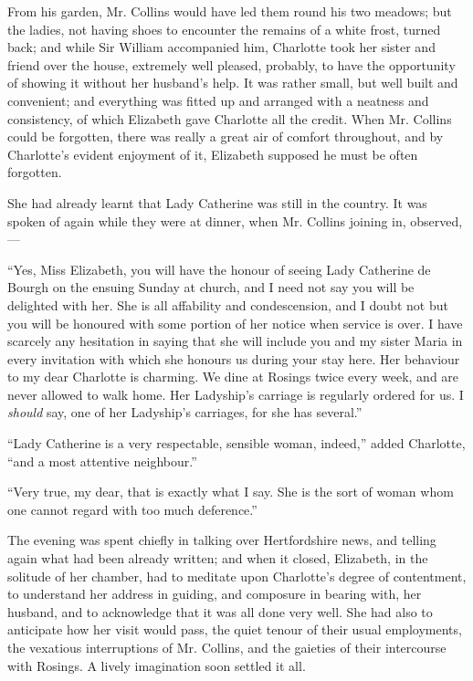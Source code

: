 From his garden, Mr. Collins would have led them round his two meadows; but the ladies, not having shoes to encounter the remains of a white frost, turned back; and while Sir William accompanied him, Charlotte took her sister and friend over the house, extremely well pleased, probably, to have the opportunity of showing it without her husband's help. It was rather small, but well built and convenient; and everything was fitted up and arranged with a neatness and consistency, of which Elizabeth gave Charlotte all the credit. When Mr. Collins could be forgotten, there was really a great air of comfort throughout, and by Charlotte's evident enjoyment of it, Elizabeth supposed he must be often forgotten.

She had already learnt that Lady Catherine was still in the country. It was spoken of again while they were at dinner, when Mr. Collins joining in, observed,---

``Yes, Miss Elizabeth, you will have the honour of seeing Lady Catherine de Bourgh on the ensuing Sunday at church, and I need not say you will be delighted with her. She is all affability and condescension, and I doubt not but you will be honoured with some portion of her notice when service is over. I have scarcely any hesitation in saying that she will include you and my sister Maria in every invitation with which she honours us during your stay here. Her behaviour to my dear Charlotte is charming. We dine at Rosings twice every week, and are never allowed to walk home. Her Ladyship's carriage is regularly ordered for us. I \textit{should} say, one of her Ladyship's carriages, for she has several.''

``Lady Catherine is a very respectable, sensible woman, indeed,'' added Charlotte, ``and a most attentive neighbour.''

``Very true, my dear, that is exactly what I say. She is the sort of woman whom one cannot regard with too much deference.''

The evening was spent chiefly in talking over Hertfordshire news, and telling again what had been already written; and when it closed, Elizabeth, in the solitude of her chamber, had to meditate upon Charlotte's degree of contentment, to understand her address in guiding, and composure in bearing with, her husband, and to acknowledge that it was all done very well. She had also to anticipate how her visit would pass, the quiet tenour of their usual employments, the vexatious interruptions of Mr. Collins, and the gaieties of their intercourse with Rosings. A lively imagination soon settled it all.

